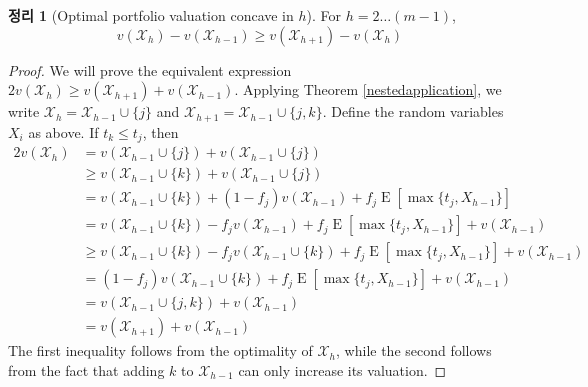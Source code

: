 \documentclass[12pt]{article} %
\newtheorem{theorem}{Theorem}
\theoremstyle{definition}
\newtheorem{theorem}{정리}
\theoremstyle{definition}
\begin{document}
\begin{theorem}[Optimal portfolio valuation concave in $h$]
For $h = 2 \dots (m-1)$, \begin{equation}v(\mathcal{X}_h) - v(\mathcal{X}_{h-1}) \geq v(\mathcal{X}_{h+1}) - v(\mathcal{X}_{h})\end{equation} 
\end{theorem}
\begin{proof}
We will prove the equivalent expression $2 v(\mathcal{X}_h) \geq v(\mathcal{X}_{h+1}) + v(\mathcal{X}_{h-1})$. Applying Theorem \ref{nestedapplication}, we write $\mathcal{X}_h = \mathcal{X}_{h-1} \cup\{j\}$ and $\mathcal{X}_{h+1} = \mathcal{X}_{h-1} \cup\{j, k\}$. Define the random variables $X_i$ as above. If $t_k \leq t_j$, then 
\begin{align}
2 v(\mathcal{X}_h) &= v(\mathcal{X}_{h-1} \cup\{j\}) + v(\mathcal{X}_{h-1} \cup\{j\}) \\
&\geq v(\mathcal{X}_{h-1} \cup\{k\}) + v(\mathcal{X}_{h-1} \cup\{j\}) \\
&= v(\mathcal{X}_{h-1} \cup\{k\}) + (1 - f_j) v(\mathcal{X}_{h-1}) + f_j \operatorname{E}[\max\{t_j, X_{h-1}\}] \\
&= v(\mathcal{X}_{h-1} \cup\{k\}) - f_j v(\mathcal{X}_{h-1}) + f_j \operatorname{E}[\max\{t_j, X_{h-1}\}] + v(\mathcal{X}_{h-1})  \\
&\geq v(\mathcal{X}_{h-1} \cup\{k\})  - f_j v(\mathcal{X}_{h-1}\cup\{k\}) + f_j \operatorname{E}[\max\{t_j, X_{h-1}\}]+ v(\mathcal{X}_{h-1})\\
&= (1 - f_j) v(\mathcal{X}_{h-1} \cup\{k\})  + f_j \operatorname{E}[\max\{t_j, X_{h-1}\}]+ v(\mathcal{X}_{h-1})\\
&=  v(\mathcal{X}_{h-1} \cup\{j, k\}) + v(\mathcal{X}_{h-1})\\
&=  v(\mathcal{X}_{h+1}) + v(\mathcal{X}_{h-1}) 
\end{align}
The first inequality follows from the optimality of $\mathcal{X}_h$, while the second follows from the fact that adding $k$ to $\mathcal{X}_{h-1}$ can only increase its valuation.


\end{proof}
\end{document}
